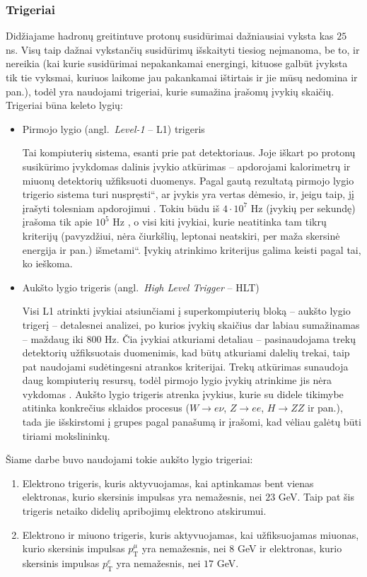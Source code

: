 \documentclass[a4paper, 12pt]{article}
\newcommand{\ltq}[1]{{\quotedblbase{}#1\textquotedblleft{}}}
\newlength\q
\begin{document}
\subsubsection{Trigeriai}

Didžiajame hadronų greitintuve protonų susidūrimai dažniausiai vyksta kas $25$ ns. Visų taip dažnai vykstančių susidūrimų išskaityti tiesiog neįmanoma, be to, ir nereikia (kai kurie susidūrimai nepakankamai energingi, kituose galbūt įvyksta tik tie vyksmai, kuriuos laikome jau pakankamai ištirtais ir jie mūsų nedomina ir pan.), todėl yra naudojami trigeriai, kurie sumažina įrašomų įvykių skaičių. Trigeriai būna keleto lygių:
\begin{itemize}
\item Pirmojo lygio (angl.\ \textit{Level-1} -- L1) trigeris

Tai kompiuterių sistema, esanti prie pat detektoriaus. Joje iškart po protonų susikūrimo įvykdomas dalinis įvykio atkūrimas -- apdorojami kalorimetrų ir miuonų detektorių užfiksuoti duomenys. Pagal gautą rezultatą pirmojo lygio trigerio sistema turi \ltq{nuspręsti}, ar įvykis yra vertas dėmesio, ir, jeigu taip, jį įrašyti tolesniam apdorojimui \cite{L1trigger}. Tokiu būdu iš $4\cdot10^{7}$ Hz (įvykių per sekundę) įrašoma tik apie $10^{5}$ Hz \cite{HLtrigger}, o visi kiti įvykiai, kurie neatitinka tam tikrų kriterijų (pavyzdžiui, nėra čiurkšlių, leptonai neatskiri, per maža skersinė energija ir pan.) \ltq{išmetami}. Įvykių atrinkimo kriterijus galima keisti pagal tai, ko ieškoma.
\item Aukšto lygio trigeris (angl.\ \textit{High Level Trigger} -- HLT)

Visi L1 atrinkti įvykiai atsiunčiami į superkompiuterių bloką -- aukšto lygio trigerį -- detalesnei analizei, po kurios įvykių skaičius dar labiau sumažinamas -- maždaug iki $800$ Hz. Čia įvykiai  atkuriami detaliau -- pasinaudojama trekų detektorių užfiksuotais duomenimis, kad būtų atkuriami dalelių trekai, taip pat naudojami sudėtingesni atrankos kriterijai. Trekų atkūrimas sunaudoja daug kompiuterių resursų, todėl pirmojo lygio įvykių atrinkime jis nėra vykdomas \cite{HLtrigger}. Aukšto lygio trigeris atrenka įvykius, kurie su didele tikimybe atitinka konkrečius sklaidos procesus ($W\rightarrow e\nu$, $Z\rightarrow ee$, $H\rightarrow ZZ$ ir pan.), tada jie išskirstomi į grupes pagal panašumą ir įrašomi, kad vėliau galėtų būti tiriami mokslininkų.
\end{itemize}

Šiame darbe buvo naudojami tokie aukšto lygio trigeriai:
\begin{enumerate}
\item Elektrono trigeris, kuris aktyvuojamas, kai aptinkamas bent vienas elektronas, kurio skersinis impulsas yra nemažesnis, nei $23$ GeV. Taip pat šis trigeris netaiko didelių apribojimų elektrono atskirumui.
\item Elektrono ir miuono trigeris, kuris aktyvuojamas, kai užfiksuojamas miuonas, kurio skersinis impulsas $p_{\mathrm{T}}^{\mu}$ yra nemažesnis, nei $8$ GeV ir elektronas, kurio skersinis impulsas $p_{\mathrm{T}}^{e}$ yra nemažesnis, nei $17$ GeV.
\end{enumerate}
\end{document}
